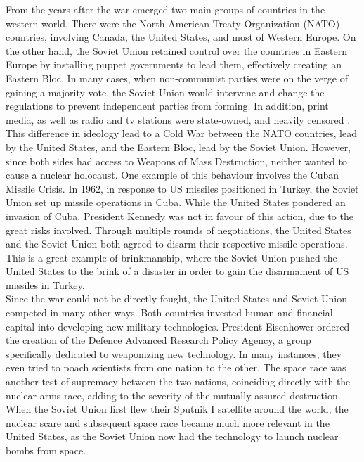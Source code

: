 \documentclass[12pt]{article}
\begin{document}
From the years after the war emerged two main groups of countries in the western world. There were the North American Treaty Organization (NATO) countries, involving Canada, the United States, and most of Western Europe\cite{13}. On the other hand, the Soviet Union retained control over the countries in Eastern Europe by installing puppet governments to lead them, effectively creating an Eastern Bloc\cite{13}. In many cases, when non-communist parties were on the verge of gaining a majority vote, the Soviet Union would intervene and change the regulations to prevent independent parties from forming. In addition, print media, as well as radio and tv stations were state-owned, and heavily censored \cite{14}.\\

This difference in ideology lead to a Cold War between the NATO countries, lead by the United States, and the Eastern Bloc, lead by the Soviet Union. However, since both sides had access to Weapons of Mass Destruction, neither wanted to cause a nuclear holocaust. One example of this behaviour involves the Cuban Missile Crisis. In 1962, in response to US missiles positioned in Turkey, the Soviet Union set up missile operations in Cuba\cite{15}. While the United States pondered an invasion of Cuba, President Kennedy was not in favour of this action, due to the great risks involved. Through multiple rounds of negotiations, the United States and the Soviet Union both agreed to disarm their respective missile operations\cite{15}. This is a great example of brinkmanship, where the Soviet Union pushed the United States to the brink of a disaster in order to gain the disarmament of US missiles in Turkey\cite{15}.\\

Since the war could not be directly fought, the United States and Soviet Union competed in many other ways. Both countries invested human and financial capital into developing new military technologies. President Eisenhower ordered the creation of the Defence Advanced Research Policy Agency, a group specifically dedicated to weaponizing new technology\cite{16}. In many instances, they even tried to poach scientists from one nation to the other. The space race was another test of supremacy between the two nations, coinciding directly with the nuclear arms race, adding to the severity of the mutually assured destruction. When the Soviet Union first flew their Sputnik I satellite around the world, the nuclear scare and subsequent space race became much more relevant in the United States, as the Soviet Union now had the technology to launch nuclear bombs from space\cite{17}.\\
\end{document}
